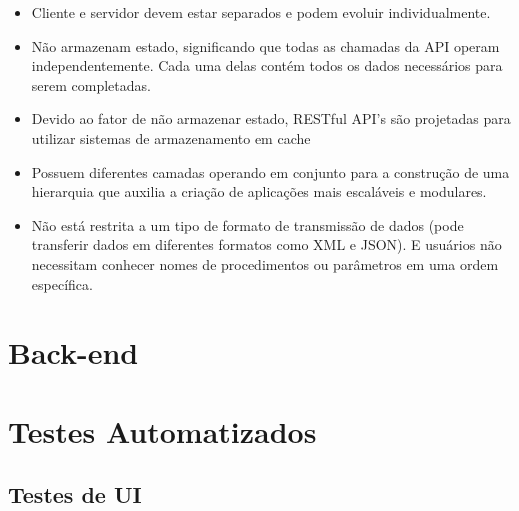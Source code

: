 \begin{itemize}
    \item Cliente e servidor devem estar separados e podem evoluir individualmente.
    \item Não armazenam estado, significando que todas as chamadas da API operam independentemente. Cada uma delas contém todos os dados necessários para serem completadas.
    \item Devido ao fator de não armazenar estado, RESTful API's são projetadas para utilizar sistemas de armazenamento em cache
    \item Possuem diferentes camadas operando em conjunto para a construção de uma hierarquia que auxilia a criação de aplicações mais escaláveis e modulares.
    \item Não está restrita a um tipo de formato de transmissão de dados (pode transferir dados em diferentes formatos como XML e JSON). E usuários não necessitam conhecer nomes de procedimentos ou parâmetros em uma ordem específica.
\end{itemize}

\section{Back-end}

\section{Testes Automatizados}
\subsection{Testes de UI}
